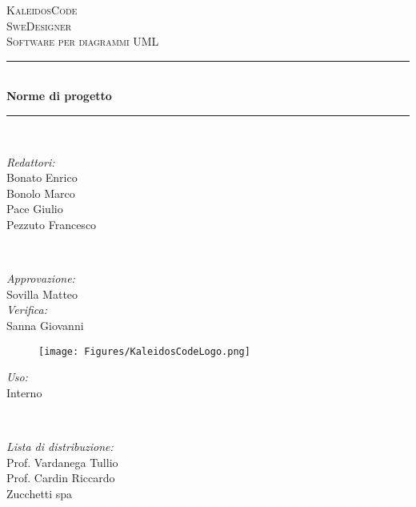 \documentclass[a4paper]{report}
\begin{document}
	
	\begin{titlepage}
		\newcommand{\HRule}{\rule{\linewidth}{0.5mm}} 
		\center  
		
		\textsc{\LARGE KaleidosCode}\\[1.5cm] 
		\textsc{\Large SweDesigner}\\[0.5cm] 
		\textsc{\large Software per diagrammi UML}\\[0.5cm]
		
		
		\HRule \\[0.4cm]
		{ \huge \bfseries Norme di progetto}\\[0.4cm] 
		\HRule \\[1.5cm]
		
		\begin{minipage}{0.4\textwidth}
			\begin{flushleft} \large
				\emph{Redattori:}\\
				Bonato Enrico\\
				Bonolo Marco\\
				Pace Giulio\\
				Pezzuto Francesco\\
			\end{flushleft}
		\end{minipage}
		~
		\begin{minipage}{0.4\textwidth}
			\begin{flushright} \large
				\emph{Approvazione:} \\
				Sovilla Matteo\\
				\emph{Verifica:} \\
				Sanna Giovanni
			\end{flushright}
		\end{minipage}
		
		\begin{figure}[H]
			\centering
			\texttt{[image: Figures/KaleidosCodeLogo.png]}
		\end{figure}
		
		\begin{minipage}{0.4\textwidth}
			\begin{flushleft} \large
				\emph{Uso:}\\
				Interno \\
				
			\end{flushleft}
		\end{minipage}
		~
		\begin{minipage}{0.4\textwidth}
			\begin{flushright} \large
				\emph{Lista di distribuzione:} \\
				Prof. Vardanega Tullio\\
				Prof. Cardin Riccardo\\
				Zucchetti spa
			\end{flushright}
		\end{minipage}
		

\end{titlepage}
\end{document}
